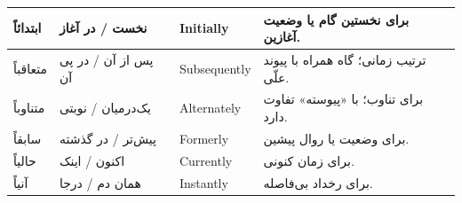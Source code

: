 \begin{longtable}{|p{2.5cm}|p{4.0cm}|p{2.3cm}|p{5.3cm}|}
\hline
ابتدائاً & نخست / در آغاز & \textenglish{Initially} & برای نخستین گام یا وضعیت آغازین. \\
\hline
متعاقباً & پس از آن / در پی آن & \textenglish{Subsequently} & ترتیب زمانی؛ گاه همراه با پیوند علّی. \\
\hline
متناوباً & یک‌درمیان / نوبتی & \textenglish{Alternately} & برای تناوب؛ با «پیوسته» تفاوت دارد. \\
\hline
سابقاً & پیش‌تر / در گذشته & \textenglish{Formerly} & برای وضعیت یا روال پیشین. \\
\hline
حالياً & اکنون / اینک & \textenglish{Currently} & برای زمان کنونی. \\
\hline
آنياً & همان دم / درجا & \textenglish{Instantly} & برای رخداد بی‌فاصله. \\
\hline
\end{longtable}
\endgroup


